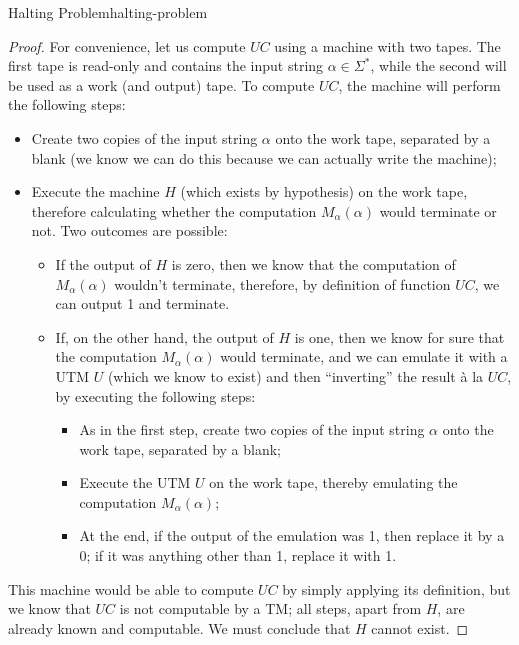 \begin{theorem}{Halting Problem}{halting-problem}
\begin{proof}
        For convenience, let us compute \(UC\) using a machine with two tapes. The first tape is read-only and contains the input string \(\alpha \in \Sigma^*\), while the second will be used as a work (and output) tape. To compute \(UC\), the machine will perform the following steps:
        \begin{itemize}
            \item Create two copies of the input string \(\alpha\) onto the work tape, separated by a blank (we know we can do this because we can actually write the machine);
            \item Execute the machine \(H\) (which exists by hypothesis) on the work tape, therefore calculating whether the computation \(M_\alpha(\alpha)\) would terminate or not. Two outcomes are possible:
            \begin{itemize}
                \item If the output of \(H\) is zero, then we know that the computation of \(M_\alpha(\alpha)\) wouldn't terminate, therefore, by definition of function \(UC\), we can output 1 and terminate.
                \item If, on the other hand, the output of \(H\) is one, then we know for sure that the computation \(M_\alpha(\alpha)\) would terminate, and we can emulate it with a UTM \(U\) (which we know to exist) and then ``inverting'' the result \`a la \(UC\), by executing the following steps:
                \begin{itemize}
                    \item As in the first step, create two copies of the input string \(\alpha\) onto the work tape, separated by a blank;
                    \item Execute the UTM \(U\) on the work tape, thereby emulating the computation \(M_\alpha(\alpha)\);
                    \item At the end, if the output of the emulation was 1, then replace it by a 0; if it was anything other than 1, replace it with 1.
                \end{itemize}
            \end{itemize}
        \end{itemize}
        This machine would be able to compute \(UC\) by simply applying its definition, but we know that \(UC\) is not computable by a TM; all steps, apart from \(H\), are already known and computable. We must conclude that \(H\) cannot exist.
    \end{proof}
\end{theorem}

